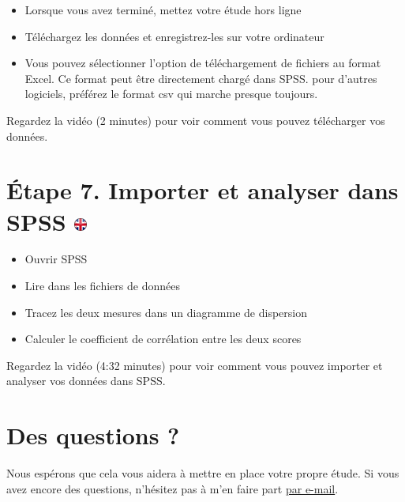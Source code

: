 \documentclass[
]{book}
\providecommand{\tightlist}{%
  \setlength{\itemsep}{0pt}\setlength{\parskip}{0pt}}
\begin{document}
\begin{itemize}
\tightlist
\item
  Lorsque vous avez terminé, mettez votre étude hors ligne
\item
  Téléchargez les données et enregistrez-les sur votre ordinateur
\item
  Vous pouvez sélectionner l'option de téléchargement de fichiers au format Excel. Ce format peut être directement chargé dans SPSS. pour d'autres logiciels, préférez le format csv qui marche presque toujours.
\end{itemize}

Regardez la vidéo (2 minutes) pour voir comment vous pouvez télécharger vos données.

\hypertarget{uxe9tape-7.-importer-et-analyser-dans-spss}{%
\section[Étape 7. Importer et analyser dans SPSS ]{\texorpdfstring{Étape 7. Importer et analyser dans SPSS \href{https://www.psytoolkit.org/lessons/questionnaire-project.html\#_step_7_import_and_analyze_in_spss}{\protect\includegraphics{img/ukflag.png}}}{Étape 7. Importer et analyser dans SPSS }}\label{uxe9tape-7.-importer-et-analyser-dans-spss}}

\begin{itemize}
\tightlist
\item
  Ouvrir SPSS
\item
  Lire dans les fichiers de données
\item
  Tracez les deux mesures dans un diagramme de dispersion
\item
  Calculer le coefficient de corrélation entre les deux scores
\end{itemize}

Regardez la vidéo (4:32 minutes) pour voir comment vous pouvez importer et analyser vos données dans SPSS.

\hypertarget{des-questions}{%
\section{Des questions ?}\label{des-questions}}

Nous espérons que cela vous aidera à mettre en place votre propre étude. Si vous avez encore des questions, n'hésitez pas à m'en faire part \href{mailto:psytoolkit@gmx.com}{par e-mail}.
\end{document}
